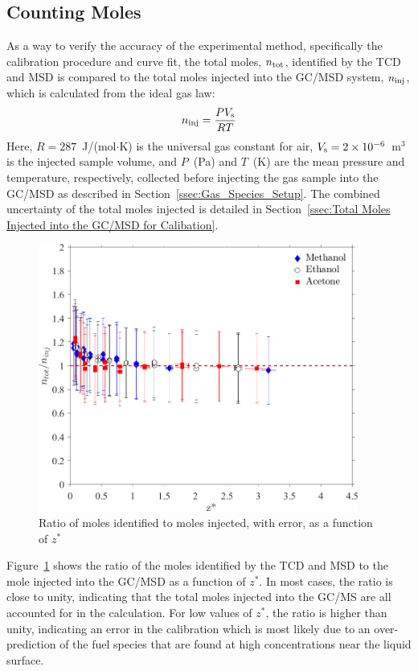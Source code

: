 \documentclass[12pt]{article}
\begin{document}
\subsection{Counting Moles}

As a way to verify the accuracy of the experimental method, specifically the calibration procedure and curve fit, the total moles, $n_{\rm tot}$, identified by the TCD and MSD is compared to the total moles injected into the GC/MSD system, $n_{\rm inj}$, which is calculated from the ideal gas law:
\begin{equation}\label{eq:moles_inj}
n_{\rm inj}=\frac{PV_{\rm s}}{RT}
\end{equation}
Here, $R=287$~J/(mol$\cdot$K) is the universal gas constant for air, $V_{\rm s}=2\times 10^{-6}$~m$^3$ is the injected sample volume, and $P$~(Pa) and $T$~(K) are the mean pressure and temperature, respectively, collected before injecting the gas sample into the GC/MSD as described in Section~\ref{ssec:Gas_Species_Setup}. The combined uncertainty of the total moles injected is detailed in Section~\ref{ssec:Total Moles Injected into the GC/MSD for Calibation}.

\begin{figure}[h!]
	\centering
\includegraphics[width=10.5cm,keepaspectratio]{mole_ratio_Comparison.png}
	\caption[Ratio of moles identified to moles injected]{Ratio of moles identified to moles injected, with error, as a function of $z^*$}
	\label{fig:Mole_Comp}
\end{figure}

Figure~\ref{fig:Mole_Comp} shows the ratio of the moles identified by the TCD and MSD to the mole injected into the GC/MSD as a function of $z^*$. In most cases, the ratio is close to unity, indicating that the total moles injected into the GC/MS are all accounted for in the calculation. For low values of $z^*$, the ratio is higher than unity, indicating an error in the calibration which is most likely due to an over-prediction of the fuel species that are found at high concentrations near the liquid surface. 
\end{document}
